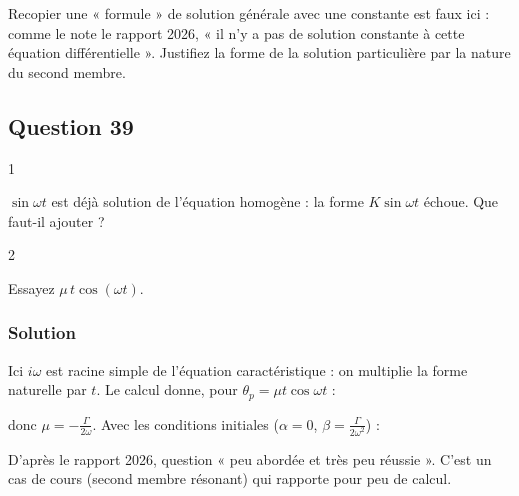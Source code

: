 \documentclass[11pt,a4paper]{article}
\newcommand{\equationajustee}[1]{%
  \sbox{\boiteequation}{$\displaystyle #1$}%
  \ifdim\wd\boiteequation>\linewidth
    \[\resizebox{\linewidth}{!}{\usebox{\boiteequation}}\]%
  \else
    \[#1\]%
  \fi}
\begin{document}
\begin{piege}

Recopier une « formule » de solution générale avec une constante est faux ici : comme le note le rapport 2026, « il n'y a pas de solution constante à cette équation différentielle ». Justifiez la forme de la solution particulière par la nature du second membre.

\end{piege}

\hypertarget{question-39}{%
\subsection{Question 39}\label{question-39}}

\begin{indication}{1}

\(\sin\omega t\) est déjà solution de l'équation homogène : la forme \(K\sin\omega t\) échoue. Que faut-il ajouter ?

\end{indication}

\begin{indication}{2}

Essayez \(\mu\,t\cos(\omega t)\).

\end{indication}

\hypertarget{solution-38}{%
\subsubsection{Solution}\label{solution-38}}

Ici \(i\omega\) est racine simple de l'équation caractéristique : on multiplie la forme naturelle par \(t\). Le calcul donne, pour \(\theta_p=\mu t\cos\omega t\) :

\equationajustee{\ddot\theta_p+\omega^2\theta_p=-2\mu\omega\sin\omega t ,}

donc \(\mu=-\frac\Gamma{2\omega}\). Avec les conditions initiales (\(\alpha=0\), \(\beta=\frac{\Gamma}{2\omega^2}\)) :

\equationajustee{\boxed{\theta(t)=\frac{\Gamma}{2\omega^2}\big(\sin\omega t-\omega t\cos\omega t\big)}}

\begin{jury}

D'après le rapport 2026, question « peu abordée et très peu réussie ». C'est un cas de cours (second membre résonant) qui rapporte pour peu de calcul.

\end{jury}
\end{document}
